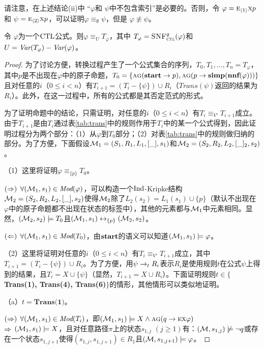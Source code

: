 请注意，在上述结论(ii)中  “$\varphi$和 $\psi$中不包含索引”是必要的。否则，令 $\varphi=\textsc{e}_{{\langle{1}\rangle}}\textsc{x} p$ 和  
$\psi$ $=\textsc{e}_{{\langle{2}\rangle}}\textsc{x} p$，可以证明$\varphi\equiv_\emptyset \psi$，但是 $\varphi\not\equiv\psi$。
\begin{proposition}\label{prop:transform:V:EQ}
	令 $\varphi$为一个$\textrm{CTL}$公式。则$\varphi\equiv_UT_\varphi$，其中 $T_\varphi={\textsc{SNF}_{\textsc{ctl}}^g}(\varphi)$和
	$U=\textit{Var}(T_\varphi)-\textit{Var}(\varphi)$。
\end{proposition}
\begin{proof}
	为了讨论方便，转换过程产生了一个公式集合的序列，$T_0, T_1, \dots, T_n=T_{\varphi}$，其中$p$是不出现在$\varphi$中的原子命题，$T_0=\{\textsc{a} \textsc{g}(\textbf{start} \rightarrow p), \textsc{a} \textsc{g}(p \rightarrow \textbf{simp}(\textbf{nnf}(\varphi)))\}$且对任意的$i$（$0\leq i < n$）有$T_{i+1} = (T_i-\{\psi\}) \cup R_i$（$Trans(\psi)$返回的结果为$R_i$）。此外，在这一过程中，所有的公式都是其否定范式的形式。
	
	为了证明命题中的结论，只需证明，对任意的$i$（$0\leq i < n$）有$T_i \equiv_{V'} T_{i+1}$成立。由于$T_{i+1}$是由$T_i$通过表\ref{tab:trans}中的规则作用于$T_i$中的某一个公式得到，因此证明过程分为两个部分：（1）从$\varphi$到$T_0$部分；（2）对表\ref{tab:trans}中的规则做归纳的部分。为了方便，下面假设${\cal M}_1=(S_1,R_1,L_1,[\_],s_1)$和${\cal M}_2=(S_2,R_2,L_2, [\_]_2, s_2)$。
	
	（1）这里将证明$\varphi \equiv_{\{p\}} T_0$。
	
	$(\Rightarrow)$ $\forall ({\cal M}_1, s_1) \in \textit{Mod}(\varphi)$，可以构造一个$\textrm{Ind}$-Kripke结构${\cal M}_2=(S_2,R_2,L_2,[\_],s_2)$使得${\cal M}_2$除了$L_2(s_2)=L_1(s_1) \cup \{p\}$（默认不出现在$\varphi$中的原子命题都不出现在状态的标签中），其他的元素都与${\cal M}_1$中元素相同。显然，$({\cal M}_2,s_2)\models T_0$且$({\cal M}_1,s_1) \leftrightarrow_{\{p\}} ({\cal M}_2, s_2)$。
	
	$(\Leftarrow)$ $\forall ({\cal M}_1,s_1) \in \textit{Mod}(T_0)$，由$\textbf{start}$的语义可以知道$({\cal M}_1,s_1) \models \varphi$。
	
	（2）这里将证明对任意的$i$（$0\leq i < n$）有$T_i \equiv_{V'} T_{i+1}$成立，其中$T_{i+1} = (T_i-\{\psi\}) \cup R_i$。为了方便，用$\psi \rightarrow_t R_i$表示$R_i$是使用规则$t$在公式$\psi$上得到的结果，且$T_i=X\cup \{\psi\}$（显然，$T_{i+1}=X\cup R_i$）。下面证明规则$t\in \{$\textbf{Trans(1), Trans(4), Trans(6)}$\}$的情形，其他情形可以类似地证明。
	
	（a）$t=\textbf{Trans(1)}$。
	
	$(\Rightarrow)$ $\forall ({\cal M}_1,s_1)\in \textit{Mod}(T_i)$，即$({\cal M}_1, s_1) \models X \wedge \textsc{a}\textsc{g}(q \rightarrow \textsc{e} \textsc{x} \varphi)$\\
	$\Rightarrow$ $({\cal M}_1,s_1) \models X$，且对任意路径$\pi$上的状态$s_{1,j}$ $(j\geq 1)$有：$({\cal M},s_{1,j}) \not \models \neg q$或存在一个状态$s_{1,j+1}$使得$(s_{1,j},s_{1,j+1})
	\in R_1$且$({\cal M},s_{1,j+1}) \models \varphi$。
	

\end{proof}
